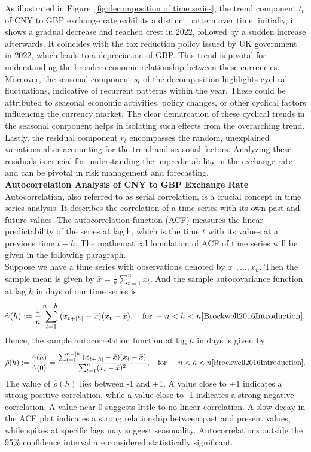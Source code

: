 \documentclass{article}\usepackage[]{graphicx}\usepackage[]{xcolor}
\begin{document}
\noindent
As illustrated in Figure~\ref{fig:decomposition of time series}, the trend component $t_t$ of CNY to GBP exchange rate exhibits a distinct pattern over time: initially, it shows a gradual decrease and reached crest in 2022, followed by a sudden increase afterwards. It coincides with the tax reduction policy issued by UK government in 2022, which leads to a depreciation of GBP. This trend is pivotal for understanding the broader economic relationship between these currencies. \\

\noindent
Moreover, the seasonal component $s_t$ of the decomposition highlights cyclical fluctuations, indicative of recurrent patterns within the year. These could be attributed to seasonal economic activities, policy changes, or other cyclical factors influencing the currency market. The clear demarcation of these cyclical trends in the seasonal component helps in isolating such effects from the overarching trend.\\

\noindent
Lastly, the residual component $r_t$ encompasses the random, unexplained variations after accounting for the trend and seasonal factors. Analyzing these residuals is crucial for understanding the unpredictability in the exchange rate and can be pivotal in risk management and forecasting.\\

\noindent
\textbf{Autocorrelation Analysis of CNY to GBP Exchange Rate}\\
\noindent
Autocorrelation, also referred to as serial correlation, is a crucial concept in time series analysis. It describes the correlation of a time series with its own past and future values. The autocorrelation function (ACF) measures the linear predictability of the series at lag h, which is the time $t$ with its values at a previous time $t-h$. The mathematical fomulation of ACF of time series will be given in the following paragraph.\\

\noindent
Suppose we have a time series with observations denoted by \( x_1, \ldots, x_n \). Then the sample mean is given by $\bar{x} = \frac{1}{n} \sum_{t=1}^{n} x_t.$
And the sample autocovariance function at lag $h$ in days of our time series is
\[\hat{\gamma}(h) := \frac{1}{n} \sum_{t=1}^{n-|h|} (x_{t+|h|} - \bar{x})(x_t - \bar{x}), \quad \text{for} \; -n < h < n \cite{Brockwell2016Introduction}.\]
Hence, the sample autocorrelation function at lag $h$ in days is given by
\[\hat{\rho}(h) := \frac{\hat{\gamma}(h)}{\hat{\gamma}(0)} = \frac{\sum_{t=1}^{n-|h|} (x_{t+|h|} - \bar{x})(x_t - \bar{x})}{\sum_{t=1}^{n} (x_t - \bar{x})^{2}}, \quad \text{for} \; -n < h < n \cite{Brockwell2016Introduction}.\]
\noindent
The value of $\hat{\rho}(h)$ lies between -1 and +1. A value close to +1 indicates a strong positive correlation, while a value close to -1 indicates a strong negative correlation. A value near 0 suggests little to no linear correlation. A slow decay in the ACF plot indicates a strong relationship between past and present values, while spikes at specific lags may suggest seasonality. Autocorrelations outside the 95\% confidence interval are considered statistically significant.\\
\end{document}
